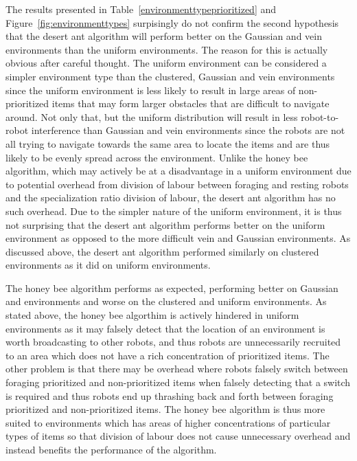 The results presented in Table~\ref{environmenttypeprioritized} and Figure~\ref{fig:environmenttypes} surpisingly do not confirm the second hypothesis that the desert ant algorithm will perform better on the Gaussian and vein environments than the uniform environments. The reason for this is actually obvious after careful thought. The uniform environment can be considered a simpler environment type than the  clustered, Gaussian and vein environments since the uniform environment is less likely to result in large areas of non-prioritized items that may form larger obstacles that are difficult to navigate around. Not only that, but the uniform distribution will result in less robot-to-robot interference than Gaussian and vein environments since the robots are not all trying to navigate towards the same area to locate the items and are thus likely to be evenly spread across the environment. Unlike the honey bee algorithm, which may actively be at a disadvantage in a uniform environment due to potential overhead from division of labour between foraging and resting robots and the specialization ratio division of labour, the desert ant algorithm has no such overhead. Due to the simpler nature of the uniform environment, it is thus not surprising that the desert ant algorithm performs better on the uniform environment as opposed to the more difficult vein and Gaussian environments. As discussed above, the desert ant algorithm performed similarly on clustered environments as it did on uniform environments. 

The honey bee algorithm performs as expected, performing better on Gaussian and environments and worse on the clustered and uniform environments. As stated above, the honey bee algorthim is actively hindered in uniform environments as it may falsely detect that the location of an environment is worth broadcasting to other robots, and thus robots are unnecessarily recruited to an area which does not have a rich concentration of prioritized items. The other problem is that there may be overhead where robots falsely switch between foraging prioritized and non-prioritized items when falsely detecting that a switch is required and thus robots end up thrashing back and forth between foraging prioritized and non-prioritized items. The honey bee algorithm is thus more suited to environments which has areas of higher concentrations of particular types of items so that division of labour does not cause unnecessary overhead and instead benefits the performance of the algorithm. 

